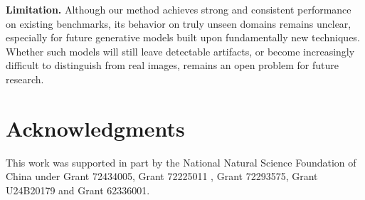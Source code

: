     \textbf{Limitation.} Although our method achieves strong and consistent performance on existing benchmarks, its behavior on truly unseen domains remains unclear, especially for future generative models built upon fundamentally new techniques. Whether such models will still leave detectable artifacts, or become increasingly difficult to distinguish from real images, remains an open problem for future research.

\section*{Acknowledgments}
{\raggedright
This work was supported in part by the National Natural Science Foundation of China under Grant 72434005, Grant 72225011 , Grant 72293575, Grant U24B20179 and Grant 62336001.
\par}